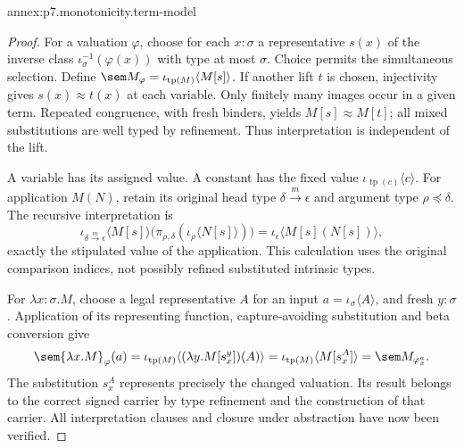 \begin{annexitem}{annex:p7.monotonicity.term-model}
\begin{proof}
For a valuation \(\varphi\), choose for each \(x:\sigma\) a representative
\(s(x)\) of the inverse class \(\iota_\sigma^{-1}(\varphi(x))\)
with type at most \(\sigma\). Choice permits the simultaneous selection.
Define
\(\sem M_\varphi=\iota_{\operatorname{tp}(M)}\langle M[s]\rangle\).
If another lift \(t\) is chosen, injectivity gives
\(s(x)\approx t(x)\) at each variable.
Only finitely many images occur in a given term.
Repeated congruence, with fresh binders, yields \(M[s]\approx M[t]\);
all mixed substitutions are well typed by refinement.
Thus interpretation is independent of the lift.

A variable has its assigned value. A constant has the fixed value
\(\iota_{\operatorname{tp}(c)}\langle c\rangle\).
For application \(M(N)\), retain its original head type
\(\delta\xrightarrow m\epsilon\) and argument type
\(\rho\preceq\delta\). The recursive interpretation is
\[
 \iota_{\delta\xrightarrow m\epsilon}\langle M[s]\rangle
   \bigl(\pi_{\rho,\delta}
             (\iota_\rho\langle N[s]\rangle)\bigr)
 =\iota_\epsilon\langle M[s](N[s])\rangle,
\]
exactly the stipulated value of the application.
This calculation uses the original comparison indices, not possibly
refined substituted intrinsic types.

For \(\lambda x:\sigma.M\), choose a legal representative \(A\) for
an input \(a=\iota_\sigma\langle A\rangle\), and fresh \(y:\sigma\).
Application of its representing function, capture-avoiding substitution
and beta conversion give
\[
 \sem{\lambda x.M}_\varphi(a)
 =\iota_{\operatorname{tp}(M)}
      \langle(\lambda y.M[s_x^y])(A)\rangle
 =\iota_{\operatorname{tp}(M)}\langle M[s_x^A]\rangle
 =\sem M_{\varphi_x^a}.
\]
The substitution \(s_x^A\) represents precisely the changed valuation.
Its result belongs to the correct signed carrier by type refinement and
the construction of that carrier. All interpretation clauses and closure
under abstraction have now been verified.
\end{proof}
\end{annexitem}

